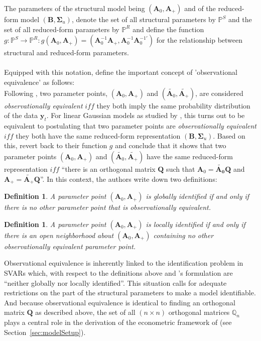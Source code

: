 \documentclass[a4paper,11pt,listof=nochaptergap,oneside,pointednumbers,bibtotoc,bigheadings,liststotoc,hidelinks]{scrbook}
\theoremstyle{mysatz}
\theoremstyle{mydefinition}
\newtheorem{defi}[satz]{Definition}
\theoremstyle{mytheorem}
\theoremstyle{mybemerkung}
\newcommand{\vect}[1]{\boldsymbol{\mathbf{#1}}}
\begin{document}
The parameters of the structural model being $(\vect{A}_0, \vect{A}_+)$ and of the reduced-form model $(\vect{B}, \vect{\Sigma}_u)$, \citet{rubioetal:10} denote the set of all structural parameters by $\mathbb{P}^S$ and the set of all reduced-form parameters by $\mathbb{P}^R$ and define the function $g: \mathbb{P}^S \to \mathbb{P}^R: g(\vect{A}_0, \vect{A}_+) = (\vect{A}_0^{-1}\vect{A}_+, \vect{A}_0^{-1}\vect{A}_0^{-1'})$ for the relationship between structural and reduced-form parameters.\\
\\
Equipped with this notation, \citet{rubioetal:10} define the important concept of 'observational equivalence' as follows: \\
Following \citet{rothenberg:71}, two parameter points, $(\vect{A}_0, \vect{A}_+)$ and $(\widetilde{\vect{A}_0}, \widetilde{\vect{A}_+})$, are considered \textit{observationally equivalent} $iff$ they both imply the same probability distribution of the data $\vect{y}_t$. For linear Gaussian models as studied by \citet{rubioetal:10}, this turns out to be equivalent to postulating that two parameter points are \textit{observationally equivalent} $iff$ they both have the same reduced-form representation $(\vect{B}, \vect{\Sigma}_u)$. Based on this, \citet{rubioetal:10} revert back to their function $g$ and conclude that it shows that two parameter points $(\vect{A}_0, \vect{A}_+)$ and $(\widetilde{\vect{A}_0}, \widetilde{\vect{A}_+})$ have the same reduced-form representation $iff$ ``there is an orthogonal matrix $\vect{Q}$ such that $\vect{A}_0 = \vect{\widetilde{\vect{A}_0}}\vect{Q}$ and $\vect{A}_+ = \widetilde{\vect{A}_+} \vect{Q}$''. In this context, the authors write down two definitions:
\begin{defi}
A parameter point $(\vect{A}_0, \vect{A}_+)$ is globally identified if and only if there is no other parameter point that is observationally equivalent.
\end{defi}
\begin{defi}
A parameter point $(\vect{A}_0, \vect{A}_+)$ is locally identified if and only if there is an open neighborhood about $(\vect{A}_0, \vect{A}_+)$ containing no other observationally equivalent parameter point.
\end{defi}

Observational equivalence is inherently linked to the identification problem in SVARs which, with respect to the definitions above and \citet{rubioetal:10}'s formulation are ``neither globally nor locally identified''. This situation calls for adequate restrictions on the part of the structural parameters to make a model identifiable. And because observational equivalence is identical to finding an orthogonal matrix $\vect{Q}$ as described above, the set of all $(n \times n)$ orthogonal matrices $\mathbb{Q}_n$ plays a central role in the derivation of the econometric framework of \citet{ludvigsonetal:19} (see Section~\ref{sec:modelSetup}).\\
	
\end{document}
